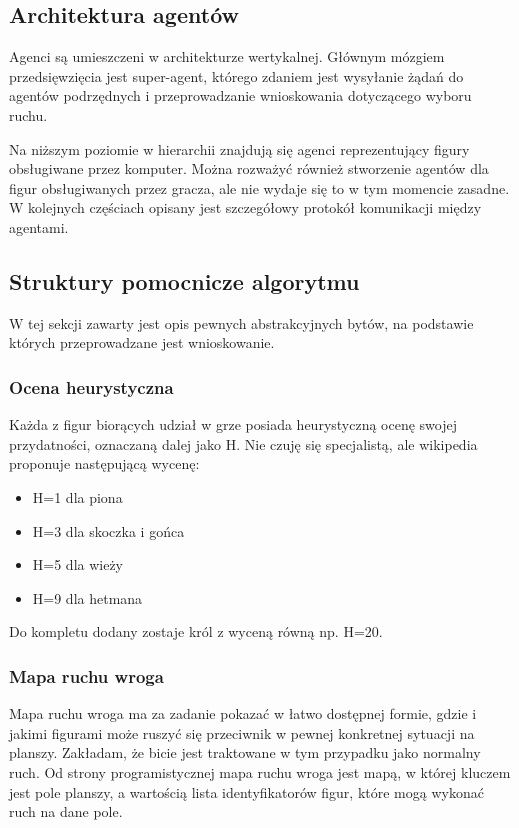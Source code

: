 \documentclass[a4paper,12pt,oneside,notitlepage,onecolumn]{article}
\begin{document}
\subsection{Architektura agentów}
Agenci są umieszczeni w architekturze wertykalnej.
Głównym mózgiem przedsięwzięcia jest super-agent, którego zdaniem jest wysyłanie żądań do agentów podrzędnych i przeprowadzanie wnioskowania dotyczącego wyboru ruchu.

Na niższym poziomie w hierarchii znajdują się agenci reprezentujący figury obsługiwane przez komputer.
Można rozważyć również stworzenie agentów dla figur obsługiwanych przez gracza, ale nie wydaje się to w tym momencie zasadne.
W kolejnych częściach opisany jest szczegółowy protokół komunikacji między agentami.

\subsection{Struktury pomocnicze algorytmu}
W tej sekcji zawarty jest opis pewnych abstrakcyjnych bytów, na podstawie których przeprowadzane jest wnioskowanie.

\subsubsection{Ocena heurystyczna}
Każda z figur biorących udział w grze posiada heurystyczną ocenę swojej przydatności, oznaczaną dalej jako H.
Nie czuję się specjalistą, ale wikipedia proponuje następującą wycenę:
\begin{itemize}
 \item H=1 dla piona
 \item H=3 dla skoczka i gońca
 \item H=5 dla wieży
 \item H=9 dla hetmana
\end{itemize}

Do kompletu dodany zostaje król z wyceną równą np. H=20.

\subsubsection{Mapa ruchu wroga}
Mapa ruchu wroga ma za zadanie pokazać w łatwo dostępnej formie, gdzie i jakimi figurami może ruszyć się przeciwnik w pewnej konkretnej sytuacji na planszy.
Zakładam, że bicie jest traktowane w tym przypadku jako normalny ruch.
Od strony programistycznej mapa ruchu wroga jest mapą, w której kluczem jest pole planszy, a wartością lista identyfikatorów figur, które mogą wykonać ruch na dane pole.
\end{document}
